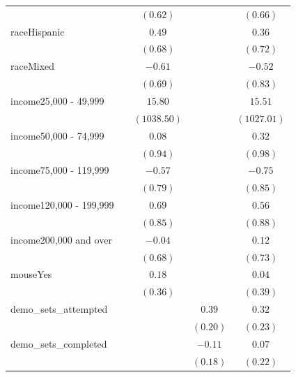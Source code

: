 \documentclass[
  12,
  letterpaper,
  DIV=11,
  numbers=noendperiod]{scrartcl}
\begin{document}
\begin{table}
{\begin{center}
\begin{tabular}{l c c c c}
                        &              & $(0.62)$     &               & $(0.66)$      \\
raceHispanic            &              & $0.49$       &               & $0.36$        \\
                        &              & $(0.68)$     &               & $(0.72)$      \\
raceMixed               &              & $-0.61$      &               & $-0.52$       \\
                        &              & $(0.69)$     &               & $(0.83)$      \\
income25,000 - 49,999   &              & $15.80$      &               & $15.51$       \\
                        &              & $(1038.50)$  &               & $(1027.01)$   \\
income50,000 - 74,999   &              & $0.08$       &               & $0.32$        \\
                        &              & $(0.94)$     &               & $(0.98)$      \\
income75,000 - 119,999  &              & $-0.57$      &               & $-0.75$       \\
                        &              & $(0.79)$     &               & $(0.85)$      \\
income120,000 - 199,999 &              & $0.69$       &               & $0.56$        \\
                        &              & $(0.85)$     &               & $(0.88)$      \\
income200,000 and over  &              & $-0.04$      &               & $0.12$        \\
                        &              & $(0.68)$     &               & $(0.73)$      \\
mouseYes                &              & $0.18$       &               & $0.04$        \\
                        &              & $(0.36)$     &               & $(0.39)$      \\
demo\_sets\_attempted   &              &              & $0.39$        & $0.32$        \\
                        &              &              & $(0.20)$      & $(0.23)$      \\
demo\_sets\_completed   &              &              & $-0.11$       & $0.07$        \\
                        &              &              & $(0.18)$      & $(0.22)$      \\

\end{tabular}
\end{center}}
\end{table}
\end{document}
